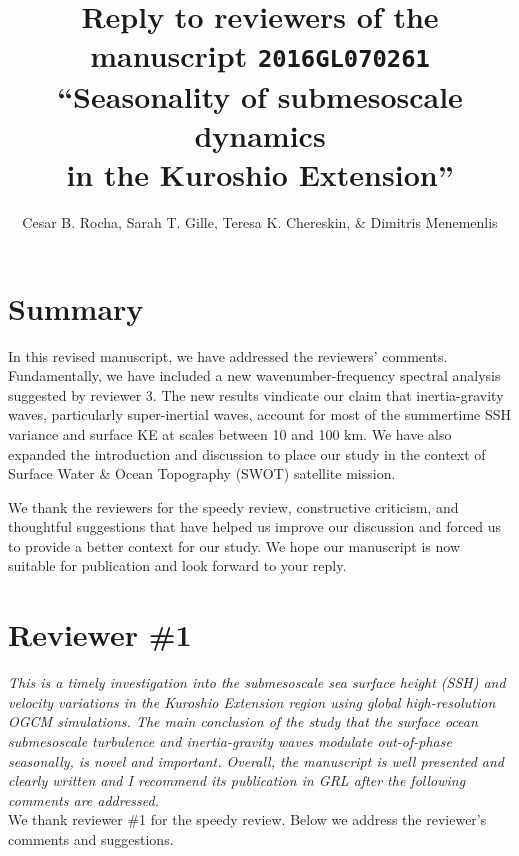 \documentclass[11pt]{article}
\title{{\normalfont Reply to reviewers of the manuscript \texttt{2016GL070261} }
       ``Seasonality of submesoscale
       dynamics \\in the Kuroshio Extension''}
\author{Cesar B. Rocha,
        Sarah T. Gille, Teresa K. Chereskin, \& Dimitris Menemenlis}
\date{}
\begin{document}
%

\maketitle

\section*{Summary}

In this revised manuscript, we have addressed the reviewers'
comments. Fundamentally, we have included a new wavenumber-frequency
spectral analysis suggested by reviewer 3. The new results vindicate
our claim that inertia-gravity waves, particularly super-inertial waves,
account for most of the summertime SSH variance and surface KE at scales
between 10 and 100 km. We have also expanded the introduction and discussion
to place our study in the context of Surface Water \& Ocean Topography (SWOT)
satellite mission.

We thank the reviewers  for the speedy review, constructive
criticism, and thoughtful suggestions that have helped us improve our discussion and
forced us to provide a better context for our study. We hope our manuscript is
now suitable for publication and look forward to your reply.


\section{Reviewer \#1}

{\it This is a timely investigation into the submesoscale sea surface height (SSH) and
velocity variations in the Kuroshio Extension region using global high-resolution
OGCM simulations. The main conclusion of the study that the surface ocean submesoscale
turbulence and inertia-gravity waves modulate out-of-phase seasonally, is novel and
important. Overall, the manuscript is well presented and clearly written and I
recommend its publication in GRL after the following comments are addressed.}\\

We thank reviewer \#1 for the speedy review. Below we address the reviewer’s
comments and suggestions.
\end{document}
